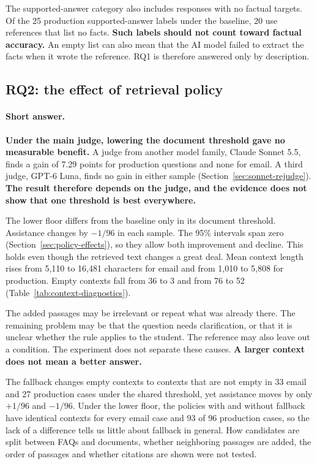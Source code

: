 The supported-answer category also includes responses with no factual targets. Of the 25 production supported-answer labels under the baseline, 20 use references that list no facts. \textbf{Such labels should not count toward factual accuracy.} An empty list can also mean that the AI model failed to extract the facts when it wrote the reference. RQ1 is therefore answered only by description.

\subsection{RQ2: the effect of retrieval policy}

\paragraph{Short answer.} \textbf{Under the main judge, lowering the document threshold gave no measurable benefit.} A judge from another model family, Claude Sonnet 5.5, finds a gain of 7.29 points for production questions and none for email. A third judge, GPT-6 Luna, finds no gain in either sample (Section~\ref{sec:sonnet-rejudge}). \textbf{The result therefore depends on the judge, and the evidence does not show that one threshold is best everywhere.}

The lower floor differs from the baseline only in its document threshold. Assistance changes by $-1/96$ in each sample. The 95\% intervals span zero (Section~\ref{sec:policy-effects}), so they allow both improvement and decline. This holds even though the retrieved text changes a great deal. Mean context length rises from 5,110 to 16,481 characters for email and from 1,010 to 5,808 for production. Empty contexts fall from 36 to 3 and from 76 to 52 (Table~\ref{tab:context-diagnostics}).

The added passages may be irrelevant or repeat what was already there. The remaining problem may be that the question needs clarification, or that it is unclear whether the rule applies to the student. The reference may also leave out a condition. The experiment does not separate these causes. \textbf{A larger context does not mean a better answer.}

The fallback changes empty contexts to contexts that are not empty in 33 email and 27 production cases under the shared threshold, yet assistance moves by only $+1/96$ and $-1/96$. Under the lower floor, the policies with and without fallback have identical contexts for every email case and 93 of 96 production cases, so the lack of a difference tells us little about fallback in general. How candidates are split between FAQs and documents, whether neighboring passages are added, the order of passages and whether citations are shown were not tested.

